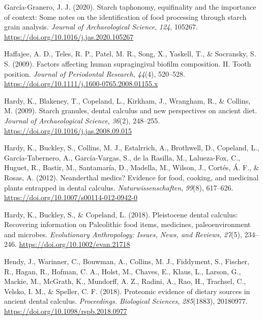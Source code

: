 \documentclass[
  letterpaper,
]{book}
\newlength{\cslhangindent}
\newlength{\cslentryspacingunit} %
\newenvironment{CSLReferences}[2] %
 {%
  \setlength{\parindent}{0pt}
  \ifodd #1
  \let\oldpar\par
  \def\par{\hangindent=\cslhangindent\oldpar}
  \fi
  \setlength{\parskip}{#2\cslentryspacingunit}
 }%
 {}
\begin{document}
\begin{CSLReferences}{1}{0}
\leavevmode{}%
García-Granero, J. J. (2020). Starch taphonomy, equifinality and the
importance of context: {Some} notes on the identification of food
processing through starch grain analysis. \emph{Journal of
Archaeological Science}, \emph{124}, 105267.
\url{https://doi.org/10.1016/j.jas.2020.105267}

\leavevmode{}%
Haffajee, A. D., Teles, R. P., Patel, M. R., Song, X., Yaskell, T., \&
Socransky, S. S. (2009). Factors affecting human supragingival biofilm
composition. {II}. {Tooth} position. \emph{Journal of Periodontal
Research}, \emph{44}(4), 520--528.
\url{https://doi.org/10.1111/j.1600-0765.2008.01155.x}

\leavevmode{}%
Hardy, K., Blakeney, T., Copeland, L., Kirkham, J., Wrangham, R., \&
Collins, M. (2009). Starch granules, dental calculus and new
perspectives on ancient diet. \emph{Journal of Archaeological Science},
\emph{36}(2), 248--255. \url{https://doi.org/10.1016/j.jas.2008.09.015}

\leavevmode{}%
Hardy, K., Buckley, S., Collins, M. J., Estalrrich, A., Brothwell, D.,
Copeland, L., García-Tabernero, A., García-Vargas, S., de la Rasilla,
M., Lalueza-Fox, C., Huguet, R., Bastir, M., Santamaría, D., Madella,
M., Wilson, J., Cortés, Á. F., \& Rosas, A. (2012). Neanderthal medics?
{Evidence} for food, cooking, and medicinal plants entrapped in dental
calculus. \emph{Naturwissenschaften}, \emph{99}(8), 617--626.
\url{https://doi.org/10.1007/s00114-012-0942-0}

\leavevmode{}%
Hardy, K., Buckley, S., \& Copeland, L. (2018). Pleistocene dental
calculus: {Recovering} information on {Paleolithic} food items,
medicines, paleoenvironment and microbes. \emph{Evolutionary
Anthropology: Issues, News, and Reviews}, \emph{27}(5), 234--246.
\url{https://doi.org/10.1002/evan.21718}

\leavevmode{}%
Hendy, J., Warinner, C., Bouwman, A., Collins, M. J., Fiddyment, S.,
Fischer, R., Hagan, R., Hofman, C. A., Holst, M., Chaves, E., Klaus, L.,
Larson, G., Mackie, M., McGrath, K., Mundorff, A. Z., Radini, A., Rao,
H., Trachsel, C., Velsko, I. M., \& Speller, C. F. (2018). Proteomic
evidence of dietary sources in ancient dental calculus.
\emph{Proceedings. Biological Sciences}, \emph{285}(1883), 20180977.
\url{https://doi.org/10.1098/rspb.2018.0977}


\end{CSLReferences}
\end{document}
